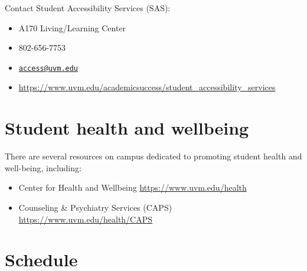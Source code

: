 \documentclass[12pt,]{article}
\providecommand{\tightlist}{%
  \setlength{\itemsep}{0pt}\setlength{\parskip}{0pt}}
\begin{document}
Contact Student Accessibility Services (SAS):

\begin{itemize}
\tightlist
\item
  A170 Living/Learning Center
\item
  802-656-7753
\item
  \href{mailto:access@uvm.edu}{\nolinkurl{access@uvm.edu}}
\item
  \url{https://www.uvm.edu/academicsuccess/student_accessibility_services}
\end{itemize}

\section{Student health and
wellbeing}\label{student-health-and-wellbeing}

There are several resources on campus dedicated to promoting student
health and well-being, including:

\begin{itemize}
\item
  Center for Health and Wellbeing \url{https://www.uvm.edu/health}
\item
  Counseling \& Psychiatry Services (CAPS)
  \url{https://www.uvm.edu/health/CAPS}
\end{itemize}

\section{Schedule}\label{schedule}
\end{document}
